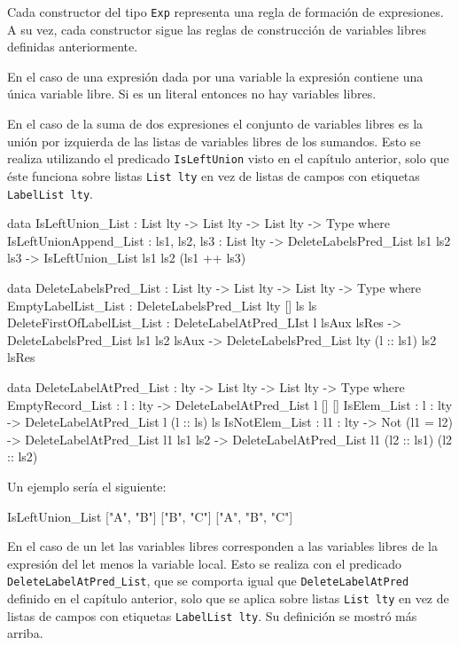 Cada constructor del tipo \texttt{Exp} representa una regla de formación de expresiones. A su vez, cada constructor sigue las reglas de construcción de variables libres definidas anteriormente.

En el caso de una expresión dada por una variable la expresión contiene una única variable libre. Si es un literal entonces no hay variables libres.

En el caso de la suma de dos expresiones el conjunto de variables libres es la unión por izquierda de las listas de variables libres de los sumandos. Esto se realiza utilizando el predicado \texttt{IsLeftUnion} visto en el capítulo anterior, solo que éste funciona sobre listas  \texttt{List lty} en vez de listas de campos con etiquetas \texttt{LabelList lty}.

\begin{code}
data IsLeftUnion_List : List lty -> List lty ->
  List lty -> Type where
  IsLeftUnionAppend_List :
    {ls1, ls2, ls3 : List lty} ->
    DeleteLabelsPred_List ls1 ls2 ls3 ->
    IsLeftUnion_List ls1 ls2 (ls1 ++ ls3)

data DeleteLabelsPred_List : List lty -> List lty ->
  List lty -> Type where
  EmptyLabelList_List : DeleteLabelsPred_List {lty} [] ls ls
  DeleteFirstOfLabelList_List : 
    DeleteLabelAtPred_LIst l lsAux lsRes ->
    DeleteLabelsPred_List ls1 ls2 lsAux ->
    DeleteLabelsPred_List {lty} (l :: ls1) ls2 lsRes

data DeleteLabelAtPred_List : lty -> List lty ->
  List lty -> Type where
  EmptyRecord_List : {l : lty} -> DeleteLabelAtPred_List l [] []
  IsElem_List : {l : lty} -> DeleteLabelAtPred_List l (l :: ls) ls
  IsNotElem_List : {l1 : lty} -> Not (l1 = l2) ->
    DeleteLabelAtPred_List l1 ls1 ls2 ->
    DeleteLabelAtPred_List l1 (l2 :: ls1) (l2 :: ls2)
\end{code}

Un ejemplo sería el siguiente:

\begin{code}
IsLeftUnion_List ["A", "B"] ["B", "C"]
  ["A", "B", "C"]
\end{code}

En el caso de un let las variables libres corresponden a las variables libres de la expresión del let menos la variable local. Esto se realiza con el predicado \texttt{DeleteLabelAtPred\_List}, que se comporta igual que \texttt{DeleteLabelAtPred} definido en el capítulo anterior, solo que se aplica sobre listas \texttt{List lty} en vez de listas de campos con etiquetas \texttt{LabelList lty}. Su definición se mostró más arriba.


